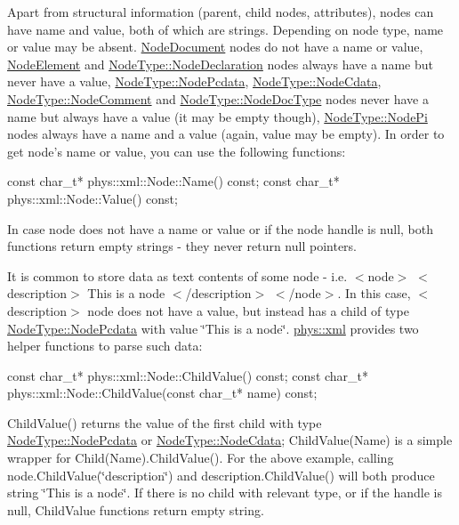 Apart from structural information (parent, child nodes, attributes), nodes can have name and value, both of which are strings. Depending on node type, name or value may be absent. \hyperlink{namespacephys_1_1xml_a668b0cc666a9d49f7c7222a7552115d3}{NodeDocument} nodes do not have a name or value, \hyperlink{namespacephys_1_1xml_a668b0cc666a9d49f7c7222a7552115d3}{NodeElement} and \hyperlink{namespacephys_1_1xml_a668b0cc666a9d49f7c7222a7552115d3}{NodeType::NodeDeclaration} nodes always have a name but never have a value, \hyperlink{namespacephys_1_1xml_a668b0cc666a9d49f7c7222a7552115d3}{NodeType::NodePcdata}, \hyperlink{namespacephys_1_1xml_a668b0cc666a9d49f7c7222a7552115d3}{NodeType::NodeCdata}, \hyperlink{namespacephys_1_1xml_a668b0cc666a9d49f7c7222a7552115d3}{NodeType::NodeComment} and \hyperlink{namespacephys_1_1xml_a668b0cc666a9d49f7c7222a7552115d3}{NodeType::NodeDocType} nodes never have a name but always have a value (it may be empty though), \hyperlink{namespacephys_1_1xml_a668b0cc666a9d49f7c7222a7552115d3}{NodeType::NodePi} nodes always have a name and a value (again, value may be empty). In order to get node's name or value, you can use the following functions: 
\begin{DoxyCode}
 const char_t* phys::xml::Node::Name() const;
 const char_t* phys::xml::Node::Value() const;
\end{DoxyCode}
 In case node does not have a name or value or if the node handle is null, both functions return empty strings -\/ they never return null pointers. \par
 \par
 It is common to store data as text contents of some node -\/ i.e. $<$node$>$ $<$description$>$ This is a node $<$/description$>$ $<$/node$>$. In this case, $<$description$>$ node does not have a value, but instead has a child of type \hyperlink{namespacephys_1_1xml_a668b0cc666a9d49f7c7222a7552115d3}{NodeType::NodePcdata} with value \char`\"{}This is a node\char`\"{}. \hyperlink{namespacephys_1_1xml}{phys::xml} provides two helper functions to parse such data: 
\begin{DoxyCode}
 const char_t* phys::xml::Node::ChildValue() const;
 const char_t* phys::xml::Node::ChildValue(const char_t* name) const;
\end{DoxyCode}
 ChildValue() returns the value of the first child with type \hyperlink{namespacephys_1_1xml_a668b0cc666a9d49f7c7222a7552115d3}{NodeType::NodePcdata} or \hyperlink{namespacephys_1_1xml_a668b0cc666a9d49f7c7222a7552115d3}{NodeType::NodeCdata}; ChildValue(Name) is a simple wrapper for Child(Name).ChildValue(). For the above example, calling node.ChildValue(\char`\"{}description\char`\"{}) and description.ChildValue() will both produce string \char`\"{}This is a node\char`\"{}. If there is no child with relevant type, or if the handle is null, ChildValue functions return empty string. \par
